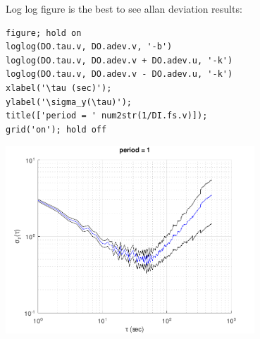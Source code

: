 Log log figure is the best to see allan deviation results:

\begin{lstlisting}
figure; hold on
loglog(DO.tau.v, DO.adev.v, '-b')
loglog(DO.tau.v, DO.adev.v + DO.adev.u, '-k')
loglog(DO.tau.v, DO.adev.v - DO.adev.u, '-k')
xlabel('\tau (sec)');
ylabel('\sigma_y(\tau)');
title(['period = ' num2str(1/DI.fs.v)]);
grid('on'); hold off
\end{lstlisting}
\begin{center}
\includegraphics[width=0.7\textwidth]{algs_examples_published/ADEV_alg_example-1.pdf}
\end{center}


\stopcontents[localtoc]
